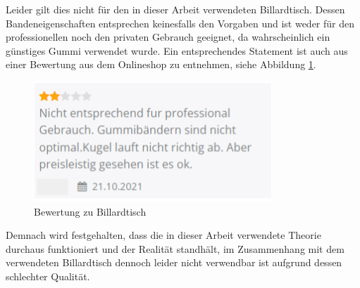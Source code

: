 Leider gilt dies nicht für den in dieser Arbeit verwendeten Billardtisch.
Dessen Bandeneigenschaften entsprechen keinesfalls den Vorgaben und ist weder für den professionellen noch den privaten Gebrauch geeignet,
da wahrscheinlich ein günstiges Gummi verwendet wurde.
Ein entsprechendes Statement ist auch aus einer Bewertung aus dem Onlineshop zu entnehmen, siehe Abbildung \ref{fig:bewertung_billardtisch}.

\begin{figure}[h!]
    \begin{center}
        \includegraphics[width=0.3\linewidth]{../common/04_results/resources/simulation/00_bewertung_billardtisch.png}
    \end{center}
    \caption{Bewertung zu Billardtisch \cite{gonser:billardtisch}}
    \label{fig:bewertung_billardtisch}
\end{figure}

Demnach wird festgehalten, dass die in dieser Arbeit verwendete Theorie durchaus funktioniert und der Realität
standhält, im Zusammenhang mit dem verwendeten Billardtisch dennoch leider nicht verwendbar ist aufgrund dessen schlechter
Qualität.

